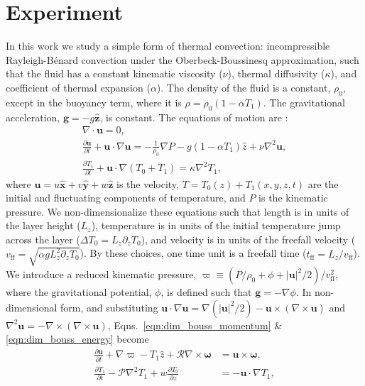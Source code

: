 \documentclass[aps, pre, onecolumn, nofootinbib, notitlepage, groupedaddress, amsfonts, amssymb, amsmath, longbibliography]{revtex4-1}
\newcommand{\DivU}{\ensuremath{\nabla\cdot\bm{u}}}
\newcommand{\grad}{\ensuremath{\nabla}}
\newcommand{\RB}{Rayleigh-B\'{e}nard }
\begin{document}
\section{Experiment}
\label{sec:experiment}
In this work we study a simple form of thermal convection:
incompressible \RB convection under the Oberbeck-Boussinesq approximation,
such that the fluid
has a constant kinematic viscosity ($\nu$), thermal diffusivity ($\kappa$), and coefficient
of thermal expansion ($\alpha$). The density of the fluid is a constant, $\rho_0$,
except in the buoyancy term, where it is $\rho = \rho_0(1  - \alpha T_1)$.
The gravitational acceleration, $\bm{g} = - g\bm{\hat{z}}$, is constant.
The equations of motion are \cite{spiegel&veronis1960}:
\begin{gather}
\DivU = 0, 
	\label{eqn:incompressible}
\\
\frac{\partial \bm{u}}{\partial t} + \bm{u}\cdot\grad\bm{u} =
-\frac{1}{\rho_0}\grad P - g( 1 - \alpha T_1)\hat{z} + \nu\grad^2\bm{u}, 
	\label{eqn:dim_bouss_momentum}
\\
\frac{\partial T_1}{\partial t} + \bm{u}\cdot\grad(T_0 + T_1) = \kappa\grad^2 T_1,
	\label{eqn:dim_bouss_energy}
\end{gather}
where $\bm{u} = u\bm{\hat{x}} + v\bm{\hat{y}} + w\bm{\hat{z}}$ is the velocity, 
$T = T_0(z) + T_1(x, y, z, t)$ are the initial and fluctuating components of temperature, 
and $P$ is the kinematic pressure.
We non-dimensionalize these equations such that
length is in units of the layer height ($L_z$),
temperature is in units of the initial temperature jump across the layer ($\Delta T_0 = L_z \partial_z T_0$), 
and velocity is in units of the freefall velocity ($v_{\text{ff}} = \sqrt{\alpha g L_z^2 \partial_z T_0}$).
By these choices, one time unit is a freefall time ($t_{\text{ff}} = L_z/v_{\text{ff}}$).
We introduce a reduced kinematic pressure,
$\varpi \equiv (P / \rho_0 + \phi + |\bm{u}|^2 / 2) / v_{\text{ff}}^2$, where the gravitational
potential, $\phi$, is defined such that $\bm{g} = -\grad \phi$. 
In non-dimensional form, and substituting 
$\bm{u}\cdot\grad\bm{u} = \grad(|\bm{u}|^2/2) - \bm{u}\times(\grad\times\bm{u})$
and $\grad^2\bm{u} = -\grad\times(\grad\times\bm{u})$, Eqns.~\ref{eqn:dim_bouss_momentum} \& \ref{eqn:dim_bouss_energy}
become
\begin{align}
\frac{\partial \bm{u}}{\partial t} + \grad \varpi - T_1\hat{z} + \mathcal{R}\grad\times\bm{\omega} &= \bm{u}\times\bm{\omega},
	\label{eqn:bouss_momentum}
\\
\frac{\partial T_1}{\partial t} - \mathcal{P}\grad^2 T_1 + w \frac{\partial T_0}{\partial z} &= - \bm{u}\cdot\grad T_1,
	\label{eqn:bouss_energy}
\end{align}
\end{document}
